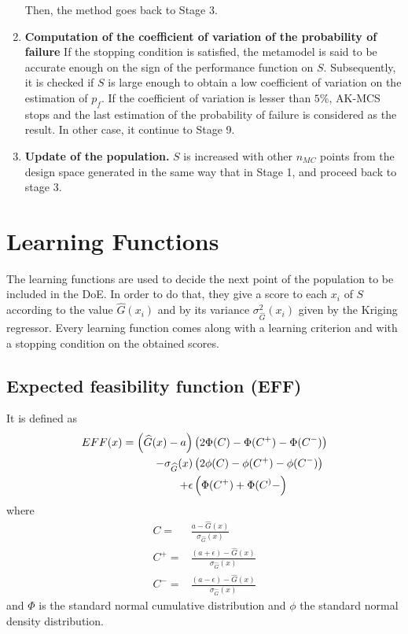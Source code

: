\begin{enumerate}
    Then, the method goes back to Stage 3.
    \item \textbf{Computation of the coefficient of variation of the probability of
    failure} If the stopping condition is satisfied, the metamodel is said to be
    accurate enough on the sign of the performance function on $S$. Subsequently,
    it is checked if $S$ is large enough to obtain a low coefficient of variation
    on the estimation of $p_f$. If the coefficient of variation is lesser than
    $5\%$, AK-MCS stops and the last estimation of the probability of failure is
    considered as the result. In other case, it continue to Stage 9.
    \item \textbf{Update of the population.} $S$ is increased with other $n_{MC}$ points from the
    design space generated in the same way that in Stage 1, and proceed back to stage 3.
\end{enumerate} 

\section{Learning Functions}
The learning functions are used to decide the next point of the population to be
included in the DoE. In order to do that, they give a score to each $x_i$ of $S$
according to the value $\widehat{G}(x_i)$ and by its variance $\sigma^2_{\widehat{G}}(x_i)$
given by the Kriging regressor. Every learning function comes along with a learning criterion
and with a stopping condition on the obtained scores.

\subsection{Expected feasibility function (EFF)}
It is defined as
\begin{align}
    EFF(x)= \left( \widehat{G}(x) - a \right)& \left( 2 \Phi (C) - \Phi (C^+) - \Phi (C^-) \right) \nonumber\\
- \sigma_{\widehat{G}}(x) & \left( 2 \phi (C) - \phi (C^+) - \phi (C^-) \right) \\
+ \epsilon & \left( \Phi (C^+) + \Phi (C^)- \right)\nonumber
\end{align}
where
\begin{align*}
    C =& \frac{a-\widehat{G}(x)}{\sigma_{\widehat{G}}(x)} \\
    C^+ =& \frac{(a + \epsilon)-\widehat{G}(x)}{\sigma_{\widehat{G}}(x)} \\
    C^- =& \frac{(a - \epsilon)-\widehat{G}(x)}{\sigma_{\widehat{G}}(x)}
\end{align*}
and $\Phi$ is the standard normal cumulative distribution and $\phi$ the standard
normal density distribution. \\

